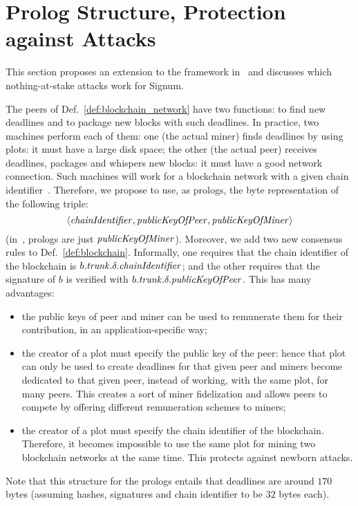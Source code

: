 \section{Prolog Structure, Protection against Attacks}\label{sec:prolog_structure_attacks}
%
This section proposes an extension to the framework in~\cite{SignumPlotting} and
discusses which nothing-at-stake attacks work for Signum.

The peers of Def.~\ref{def:blockchain_network} have two functions: to find new deadlines and to
package new blocks with such deadlines. In practice, two machines perform each of them:
one (the actual miner) finds deadlines by using plots: it must have a large disk space; the other (the actual peer)
receives deadlines, packages and whispers new blocks: it must have a good network connection.
Such machines will work for a blockchain network with a given chain identifier~\cite{Antonopoulos17}.
Therefore, we propose to use, as prologs, the byte representation of the following triple:
\[
\langle{\mathit{chainIdentifier}},{\mathit{publicKeyOfPeer}},{\mathit{publicKeyOfMiner}}\rangle
\]
(in~\cite{SignumPlotting}, prologs are just ${\mathit{publicKeyOfMiner}}$).
Moreover, we add two new consensus rules to Def.~\ref{def:blockchain}. Informally, one requires
that the chain identifier of the blockchain is $b.{\mathit{trunk}}.\delta.{\mathit{chainIdentifier}}$; and the other requires that
the signature of $b$ is verified with $b.{\mathit{trunk}}.\delta.{\mathit{publicKeyOfPeer}}$.
This has many advantages:
%
\begin{itemize}
\item the public keys of peer and miner can be used to remunerate them for their contribution,
  in an application-specific way;
\item the creator of a plot must specify the public key of the peer: hence that plot
  can only be used to create deadlines for that given peer and miners become dedicated to that given
  peer, instead of working, with the same plot, for many peers. This creates a sort of miner
  fidelization and allows peers to compete by offering different remuneration schemes to miners;
\item the creator of a plot must specify the chain identifier of the blockchain.
  Therefore, it becomes impossible to use the same plot for mining two
  blockchain networks at the same time. This protects against newborn attacks.
\end{itemize}
%
Note that this structure for the prologs entails that deadlines are around $170$ bytes
(assuming hashes, signatures and chain identifier to be $32$ bytes each).

